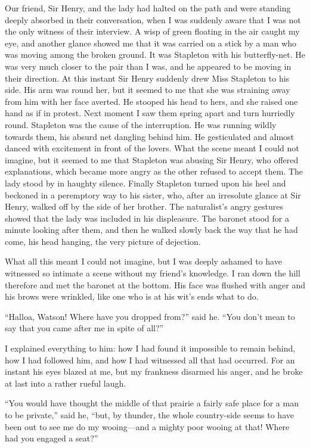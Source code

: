 \documentclass[paper=5.5in:8.5in,BCOR=7mm,twoside,DIV=calc,12pt,usegeometry,openany,chapterprefix,endperiod,headings=big]{scrbook} %
\begin{document}
Our friend, Sir Henry, and the lady had halted on the path and were standing deeply absorbed in their conversation, when I was suddenly aware that I was not the only witness of their interview. A wisp of green floating in the air caught my eye, and another glance showed me that it was carried on a stick by a man who was moving among the broken ground. It was Stapleton with his butterfly-net. He was very much closer to the pair than I was, and he appeared to be moving in their direction. At this instant Sir Henry suddenly drew Miss Stapleton to his side. His arm was round her, but it seemed to me that she was straining away from him with her face averted. He stooped his head to hers, and she raised one hand as if in protest. Next moment I saw them spring apart and turn hurriedly round. Stapleton was the cause of the interruption. He was running wildly towards them, his absurd net dangling behind him. He gesticulated and almost danced with excitement in front of the lovers. What the scene meant I could not imagine, but it seemed to me that Stapleton was abusing Sir Henry, who offered explanations, which became more angry as the other refused to accept them. The lady stood by in haughty silence. Finally Stapleton turned upon his heel and beckoned in a peremptory way to his sister, who, after an irresolute glance at Sir Henry, walked off by the side of her brother. The naturalist's angry gestures showed that the lady was included in his displeasure. The baronet stood for a minute looking after them, and then he walked slowly back the way that he had come, his head hanging, the very picture of dejection.

What all this meant I could not imagine, but I was deeply a\-shamed to have witnessed so intimate a scene without my friend's knowledge. I ran down the hill therefore and met the baronet at the bottom. His face was flushed with anger and his brows were wrin\-kled, like one who is at his wit's ends what to do.

\enquote{Halloa, Watson! Where have you dropped from?} said he. \enquote{You don't mean to say that you came after me in spite of all?}

I explained everything to him: how I had found it impossible to remain behind, how I had followed him, and how I had witnessed all that had occurred. For an instant his eyes blazed at me, but my frankness disarmed his anger, and he broke at last into a rather rueful laugh.

\enquote{You would have thought the middle of that prairie a fairly safe place for a man to be private,} said he, \enquote{but, by thunder, the whole country-side seems to have been out to see me do my wooing---and a mighty poor wooing at that! Where had you engaged a seat?}
\end{document}
